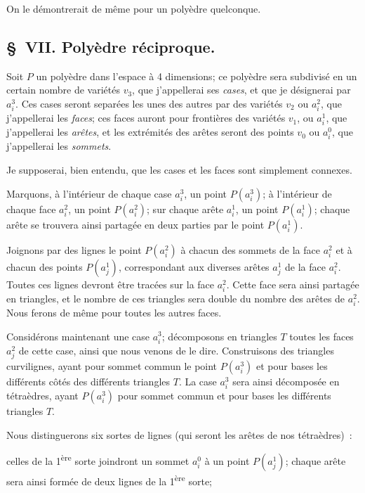 \documentclass{article}
\begin{document}
On le démontrerait de même pour un polyèdre quelconque.

\subsection*{\S~VII. Polyèdre réciproque.}

Soit $P$ un polyèdre dans l'espace à 4 dimensions; ce polyèdre sera subdivisé en un certain nombre de variétés $v_{3}$, que j'appellerai ses \emph{cases}, et que je désignerai par $a^{3}_{i}$. Ces cases seront separées les unes des autres par des variétés $v_{2}$ ou $a^{2}_{i}$, que j'appellerai les \emph{faces}; ces faces auront pour frontières des variétés $v_{1}$, ou $a^{1}_{i}$, que j'appellerai les \emph{arêtes}, et les extrémités des arêtes seront des points $v_{0}$ ou $a^{0}_{i}$, que j'appellerai les \emph{sommets}.

Je supposerai, bien entendu, que les cases et les faces sont simplement connexes.

Marquons, à l'intérieur de chaque case $a^{3}_{i}$, un point $P(a^{3}_{i})$; à l'intérieur de chaque face $a^{2}_{i}$, un point $P(a^{2}_{i})$; sur chaque arête $a^{1}_{i}$, un point $P(a^{1}_{i})$; chaque arête se trouvera ainsi partagée en deux parties par le point $P(a^{1}_{i})$.

Joignons par des lignes le point $P(a^{2}_{i})$ à chacun des sommets de la face $a^{2}_{i}$ et à chacun des points $P(a^{1}_{j})$, correspondant aux diverses arêtes $a^{1}_{j}$ de la face $a^{2}_{i}$. Toutes ces lignes devront être tracées sur la face $a^{2}_{i}$. Cette face sera ainsi partagée en triangles, et le nombre de ces triangles sera double du nombre des arêtes de $a^{2}_{i}$. Nous ferons de même pour toutes les autres faces.

Considérons maintenant une case $a^{3}_{i}$; décomposons en triangles $T$ toutes les faces $a^{2}_{j}$ de cette case, ainsi que nous venons de le dire. Construisons des triangles curvilignes, ayant pour sommet commun le point $P(a^{3}_{i})$ et pour bases les différents côtés des différents triangles $T$. La case $a^{3}_{i}$ sera ainsi décomposée en tétraèdres, ayant $P(a^{3}_{i})$ pour sommet commun et pour bases les différents triangles $T$.


Nous distinguerons six sortes de lignes (qui seront les arêtes de nos tétraèdres)~:

celles de la 1\textsuperscript{ère} sorte joindront un sommet $a^{0}_{i}$ à un point $P(a^{1}_{j})$; chaque arête sera ainsi formée de deux lignes de la 1\textsuperscript{ère} sorte;
\end{document}

